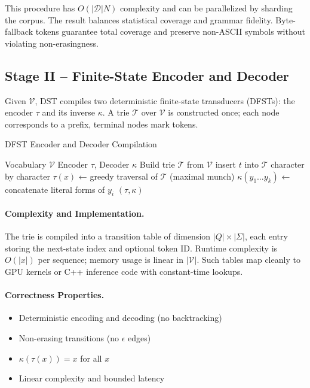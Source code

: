 This procedure has $O(|\mathcal{D}|N)$ complexity and can be
parallelized by sharding the corpus.
The result balances statistical coverage and grammar fidelity.
Byte-fallback tokens guarantee total coverage and
preserve non-ASCII symbols without violating non-erasingness.

\subsection{Stage II – Finite-State Encoder and Decoder}
\label{sec:method-fst}

Given $\mathcal{V}$, DST compiles two deterministic finite-state
transducers (DFSTs): the encoder $\tau$ and its inverse $\kappa$.
A trie $\mathcal{T}$ over $\mathcal{V}$ is constructed once;
each node corresponds to a prefix, terminal nodes mark tokens.

\begin{algorithm}[H]
\caption{DFST Encoder and Decoder Compilation}
\label{alg:fst}
\begin{algorithmic}[1]
\REQUIRE Vocabulary $\mathcal{V}$
\ENSURE Encoder $\tau$, Decoder $\kappa$
\STATE Build trie $\mathcal{T}$ from $\mathcal{V}$
  \STATE insert $t$ into $\mathcal{T}$ character by character
\ENDFOR
\STATE $\tau(x)$ ← greedy traversal of $\mathcal{T}$ (maximal munch)
\STATE $\kappa(y_1\dots y_k)$ ← concatenate literal forms of $y_i$
\RETURN $(\tau,\kappa)$
\end{algorithmic}
\end{algorithm}

\paragraph{Complexity and Implementation.}
The trie is compiled into a transition table
of dimension $|Q|\!\times\!|\Sigma|$,
each entry storing the next-state index and optional token ID.
Runtime complexity is $O(|x|)$ per sequence;
memory usage is linear in $|\mathcal{V}|$.
Such tables map cleanly to GPU kernels or C++ inference code
with constant-time lookups.

\paragraph{Correctness Properties.}
\begin{itemize}
  \item Deterministic encoding and decoding (no backtracking)
  \item Non-erasing transitions (no $\epsilon$ edges)
  \item $\kappa(\tau(x))\!=\!x$ for all $x$
  \item Linear complexity and bounded latency
\end{itemize}

